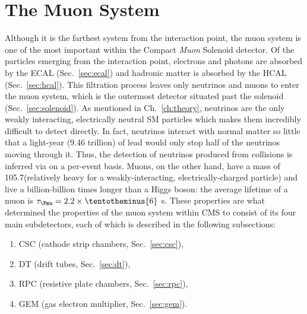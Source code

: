 \section{The Muon System}
\label{sec:muon_sys}
Although it is the farthest system from the interaction point, the muon system is one of the most important within the Compact \emph{Muon} Solenoid detector.
Of the particles emerging from the interaction point, electrons and photons are absorbed by the ECAL (Sec.~\ref{sec:ecal}) and hadronic matter is absorbed by the HCAL (Sec.~\ref{sec:hcal}).
This filtration process leaves only neutrinos and muons to enter the muon system, which is the outermost detector situated past the solenoid (Sec.~\ref{sec:solenoid}).
As mentioned in Ch.~\ref{ch:theory}, neutrinos are the only weakly interacting, electrically neutral SM particles which makes them incredibly difficult to detect directly.
In fact, neutrinos interact with normal matter so little that a light-year (9.46 trillion\Km) of lead would only stop half of the neutrinos moving through it.
Thus, the detection of neutrinos produced from \pp collisions is inferred via \MET on a per-event basis.
Muons, on the other hand, have a mass of 105.7\MeV (relatively heavy for a weakly-interacting, electrically-charged particle) and live a billion-billion times longer than a Higgs boson: the average lifetime of a muon is $\tau_{\Pmu} = 2.2 \times \tentotheminus{6}$ s.
These properties are what determined the properties of the muon system within CMS to consist of its four main subdetectors, each of which is described in the following subsections:
\begin{enumerate}
    \item CSC (cathode strip chambers, Sec.~\ref{sec:csc}),
    \item DT (drift tubes, Sec.~\ref{sec:dt}),
    \item RPC (resistive plate chambers, Sec.~\ref{sec:rpc}),
    \item GEM (gas electron multiplier, Sec.~\ref{sec:gem}).
\end{enumerate}

